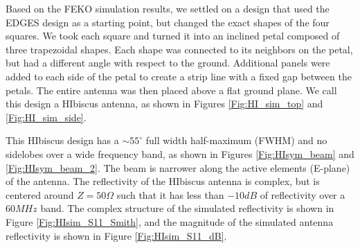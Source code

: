Based on the FEKO simulation results, we settled on a design that used the EDGES design as a starting point, but changed the exact shapes of the four squares. We took each square and turned it into an inclined petal composed of three trapezoidal shapes. Each shape was connected to its neighbors on the petal, but had a different angle with respect to the ground. Additional panels were added to each side of the petal to create a strip line with a fixed gap between the petals. The entire antenna was then placed above a flat ground plane. We call this design a HIbiscus antenna, as shown in Figures \ref{Fig:HI_sim_top} and \ref{Fig:HI_sim_side}. 

This HIbiscus design has a $\sim 55^\circ$ full width half-maximum (FWHM) and no sidelobes over a wide frequency band, as shown in Figures \ref{Fig:HIsym_beam} and \ref{Fig:HIsym_beam_2}. The beam is narrower along the active elements (E-plane) of the antenna. The reflectivity of the HIbiscus antenna is complex, but is centered around $Z= 50 \Omega$ such that it has less than $-10 dB$ of reflectivity over a $60 MHz$ band. The complex structure of the simulated reflectivity is shown in Figure \ref{Fig:HIsim_S11_Smith}, and the magnitude of the simulated antenna reflectivity is shown in Figure \ref{Fig:HIsim_S11_dB}. 

